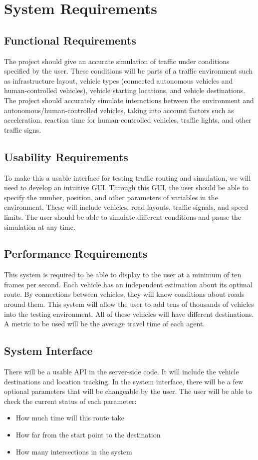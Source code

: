 \documentclass[10pt,letterpaper,draftclsnofoot,onecolumn]{IEEEtran}
\begin{document}
\section{System Requirements}
	\subsection{Functional Requirements}
	The project should give an accurate simulation of traffic under conditions specified by the user. These conditions will be parts of a traffic environment such as infrastructure layout, vehicle types (connected autonomous vehicles and human-controlled vehicles), vehicle starting locations, and vehicle destinations. The project should accurately simulate interactions between the environment and autonomous/human-controlled vehicles, taking into account factors such as acceleration, reaction time for human-controlled vehicles, traffic lights, and other traffic signs.
	\subsection{Usability Requirements}
	To make this a usable interface for testing traffic routing and simulation, we will need to develop an intuitive GUI. Through this GUI, the user should be able to specify the number, position, and other parameters of variables in the environment. These will include vehicles, road layouts, traffic signals, and speed limits. The user should be able to simulate different conditions and pause the simulation at any time.
	\subsection{Performance Requirements}
	This system is required to be able to display to the user at a minimum of ten frames per second. Each vehicle has an independent estimation about its optimal route. By connections between vehicles, they will know conditions about roads around them. This system will allow the user to add tens of thousands of vehicles into the testing environment. All of these vehicles will have different destinations. A metric to be used will be the average travel time of each agent.
	\subsection{System Interface}
	There will be a usable API in the server-side code. It will include the vehicle destinations and location tracking. In the system interface, there will be a few optional parameters that will be changeable by the user. The user will be able to check the current status of each parameter:
	\begin{itemize}
		\item How much time will this route take
		\item How far from the start point to the destination
		\item How many intersections in the system
	\end{itemize}
\end{document}
